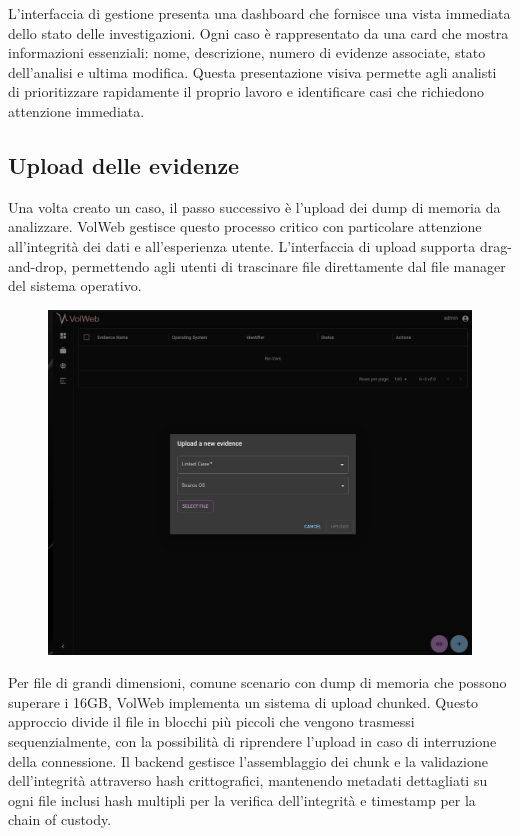L'interfaccia di gestione presenta una dashboard che fornisce una vista immediata dello stato delle investigazioni. Ogni caso è rappresentato da una card che mostra informazioni essenziali: nome, descrizione, numero di evidenze associate, stato dell'analisi e ultima modifica. Questa presentazione visiva permette agli analisti di prioritizzare rapidamente il proprio lavoro e identificare casi che richiedono attenzione immediata.

\subsection{Upload delle evidenze}

Una volta creato un caso, il passo successivo è l'upload dei dump di memoria da analizzare. VolWeb gestisce questo processo critico con particolare attenzione all'integrità dei dati e all'esperienza utente. L'interfaccia di upload supporta drag-and-drop, permettendo agli utenti di trascinare file direttamente dal file manager del sistema operativo.

\begin{figure}[H]
    \centering
    \includegraphics[width=0.9\linewidth]{images/volweb-original/volweb-upload-interface.png}
\end{figure}

Per file di grandi dimensioni, comune scenario con dump di memoria che possono superare i 16GB, VolWeb implementa un sistema di upload chunked. Questo approccio divide il file in blocchi più piccoli che vengono trasmessi sequenzialmente, con la possibilità di riprendere l'upload in caso di interruzione della connessione. Il backend gestisce l'assemblaggio dei chunk e la validazione dell'integrità attraverso hash crittografici, mantenendo metadati dettagliati su ogni file inclusi hash multipli per la verifica dell'integrità e timestamp per la chain of custody.

